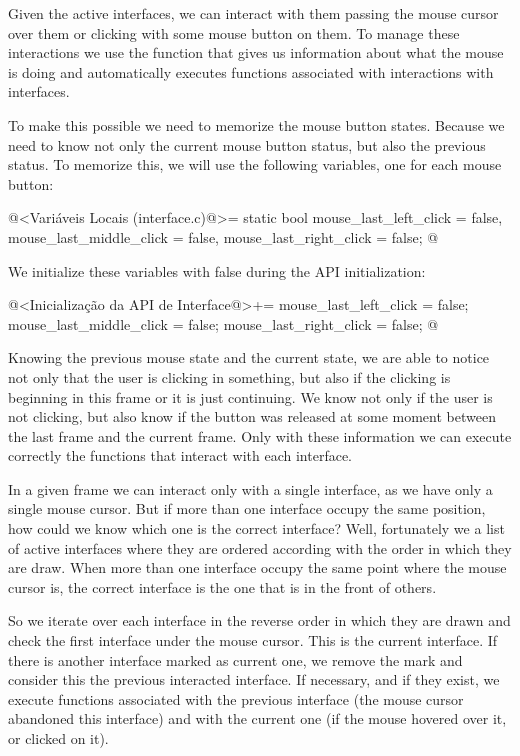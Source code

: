 Given the active interfaces, we can interact with them passing the
mouse cursor over them or clicking with some mouse button on them. To
manage these interactions we use the
function  that gives us information
about what the mouse is doing and automatically executes functions
associated with interactions with interfaces.

To make this possible we need to memorize the mouse button
states. Because we need to know not only the current mouse button
status, but also the previous status. To memorize this, we will use
the following variables, one for each mouse button:

\iniciocodigo
@<Variáveis Locais (interface.c)@>=
static bool mouse_last_left_click = false, mouse_last_middle_click = false,
  mouse_last_right_click = false;
@
\fimcodigo

We initialize these variables with false during the API
initialization:

\iniciocodigo
@<Inicialização da API de Interface@>+=
mouse_last_left_click = false;
mouse_last_middle_click = false;
mouse_last_right_click = false;
@
\fimcodigo

Knowing the previous mouse state and the current state, we are able to
notice not only that the user is clicking in something, but also if
the clicking is beginning in this frame or it is just continuing. We
know not only if the user is not clicking, but also know if the button
was released at some moment between the last frame and the current
frame. Only with these information we can execute correctly the
functions that interact with each interface.

In a given frame we can interact only with a single interface, as we
have only a single mouse cursor. But if more than one interface occupy
the same position, how could we know which one is the correct
interface? Well, fortunately we a list of active interfaces where they
are ordered according with the order in which they are draw. When more
than one interface occupy the same point where the mouse cursor is,
the correct interface is the one that is in the front of others. 

So we iterate over each interface in the reverse order in which they
are drawn and check the first interface under the mouse cursor. This
is the current interface. If there is another interface marked as
current one, we remove the mark and consider this the previous
interacted interface. If necessary, and if they exist, we execute
functions associated with the previous interface (the mouse cursor
abandoned this interface) and with the current one (if the mouse
hovered over it, or clicked on it).

